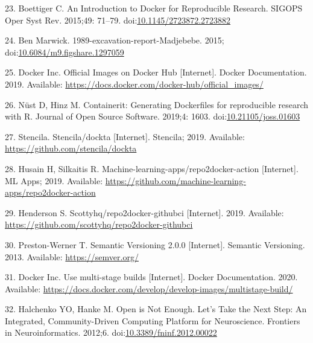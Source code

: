 \documentclass[10pt,letterpaper]{article}
\begin{document}
\leavevmode\hypertarget{ref-boettiger_introduction_2015}{}%
23. Boettiger C. An Introduction to Docker for Reproducible Research.
SIGOPS Oper Syst Rev. 2015;49: 71--79.
doi:\href{https://doi.org/10.1145/2723872.2723882}{10.1145/2723872.2723882}

\leavevmode\hypertarget{ref-marwick_madjebebe_2015}{}%
24. Ben Marwick. 1989-excavation-report-Madjebebe. 2015;
doi:\href{https://doi.org/10.6084/m9.figshare.1297059}{10.6084/m9.figshare.1297059}

\leavevmode\hypertarget{ref-docker_inc_official_2019}{}%
25. Docker Inc. Official Images on Docker Hub {[}Internet{]}. Docker
Documentation. 2019. Available:
\url{https://docs.docker.com/docker-hub/official_images/}

\leavevmode\hypertarget{ref-nust_containerit_2019}{}%
26. Nüst D, Hinz M. Containerit: Generating Dockerfiles for reproducible
research with R. Journal of Open Source Software. 2019;4: 1603.
doi:\href{https://doi.org/10.21105/joss.01603}{10.21105/joss.01603}

\leavevmode\hypertarget{ref-stencila_dockta_2019}{}%
27. Stencila. Stencila/dockta {[}Internet{]}. Stencila; 2019. Available:
\url{https://github.com/stencila/dockta}

\leavevmode\hypertarget{ref-husain_repo2docker-action_2019}{}%
28. Husain H, Silkaitis R. Machine-learning-apps/repo2docker-action
{[}Internet{]}. ML Apps; 2019. Available:
\url{https://github.com/machine-learning-apps/repo2docker-action}

\leavevmode\hypertarget{ref-scottyhq_repo2docker-githubci_2019}{}%
29. Henderson S. Scottyhq/repo2docker-githubci {[}Internet{]}. 2019.
Available: \url{https://github.com/scottyhq/repo2docker-githubci}

\leavevmode\hypertarget{ref-preston-werner_semantic_2013}{}%
30. Preston-Werner T. Semantic Versioning 2.0.0 {[}Internet{]}. Semantic
Versioning. 2013. Available: \url{https://semver.org/}

\leavevmode\hypertarget{ref-docker_multi-stage_2020}{}%
31. Docker Inc. Use multi-stage builds {[}Internet{]}. Docker
Documentation. 2020. Available:
\url{https://docs.docker.com/develop/develop-images/multistage-build/}

\leavevmode\hypertarget{ref-halchenko_open_2012}{}%
32. Halchenko YO, Hanke M. Open is Not Enough. Let's Take the Next Step:
An Integrated, Community-Driven Computing Platform for Neuroscience.
Frontiers in Neuroinformatics. 2012;6.
doi:\href{https://doi.org/10.3389/fninf.2012.00022}{10.3389/fninf.2012.00022}
\end{document}

